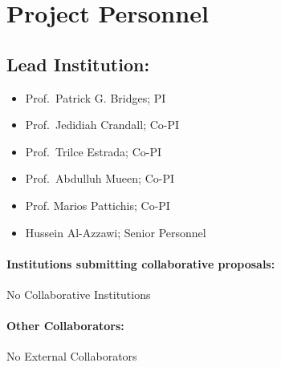 \documentclass[11pt]{article}
\author{}
\date{}
\begin{document}
\pagestyle{fancy}
\addtolength{\baselineskip}{-1pt}
\newpage
\setcounter{page}{1}





\section*{Project Personnel}
\subsection*{Lead Institution:}

\begin{minipage}{6in}
\begin{multicols}{2}
\begin{itemize}
\item Prof.~Patrick G. Bridges; PI
\item Prof.~Jedidiah Crandall; Co-PI
\item Prof.~Trilce Estrada; Co-PI
\item Prof.~Abdulluh Mueen; Co-PI
\item Prof. Marios Pattichis; Co-PI
\item Hussein Al-Azzawi; Senior Personnel
\end{itemize}
\end{multicols}
\end{minipage}

\vspace*{0.1in}
\paragraph{Institutions submitting collaborative proposals:} No Collaborative Institutions

\paragraph{Other Collaborators:} No External Collaborators

\vspace*{0.2in}
\end{document}
